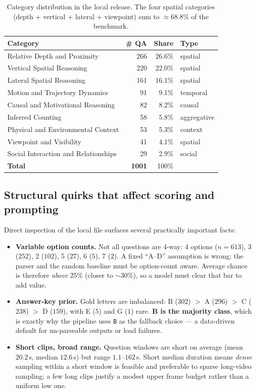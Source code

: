 \documentclass[11pt]{article}
\begin{document}
\begin{table}[ht]
\centering
\small
\begin{tabular}{l r r l}
\toprule
\textbf{Category} & \textbf{\# QA} & \textbf{Share} & \textbf{Type} \\
\midrule
Relative Depth and Proximity         & 266 & 26.6\% & spatial \\
Vertical Spatial Reasoning           & 220 & 22.0\% & spatial \\
Lateral Spatial Reasoning            & 161 & 16.1\% & spatial \\
Motion and Trajectory Dynamics       &  91 &  9.1\% & temporal \\
Causal and Motivational Reasoning    &  82 &  8.2\% & causal \\
Inferred Counting                    &  58 &  5.8\% & aggregative \\
Physical and Environmental Context   &  53 &  5.3\% & context \\
Viewpoint and Visibility             &  41 &  4.1\% & spatial \\
Social Interaction and Relationships &  29 &  2.9\% & social \\
\midrule
\textbf{Total}                       & \textbf{1001} & 100\% & \\
\bottomrule
\end{tabular}
\caption{Category distribution in the local release. The four spatial categories
(depth + vertical + lateral + viewpoint) sum to $\approx$68.8\% of the benchmark.}
\label{tab:cats}
\end{table}

\subsection{Structural quirks that affect scoring and prompting}
Direct inspection of the local file surfaces several practically important facts:

\begin{itemize}[leftmargin=1.4em,itemsep=2pt]
  \item \textbf{Variable option counts.} Not all questions are 4-way: 4 options
  ($n{=}613$), 3 ($252$), 2 ($102$), 5 ($27$), 6 ($5$), 7 ($2$). A fixed
  ``A--D'' assumption is wrong; the parser and the random baseline must be
  option-count aware. Average chance is therefore \emph{above} 25\% (closer to
  $\sim$30\%), so a model must clear that bar to add value.
  \item \textbf{Answer-key prior.} Gold letters are imbalanced:
  B ($302$) $>$ A ($296$) $>$ C ($238$) $>$ D ($159$), with E ($5$) and G ($1$)
  rare. \textbf{B is the majority class}, which is exactly why the pipeline uses
  \texttt{B} as the fallback choice --- a data-driven default for un-parseable
  outputs or load failures.
  \item \textbf{Short clips, broad range.} Question windows are short on average
  (mean $20.2$\,s, median $12.6$\,s) but range $1.1$--$162$\,s. Short median
  duration means \emph{dense} sampling within a short window is feasible and
  preferable to sparse long-video sampling; a few long clips justify a modest
  upper frame budget rather than a uniform low one.
\end{itemize}
\end{document}
